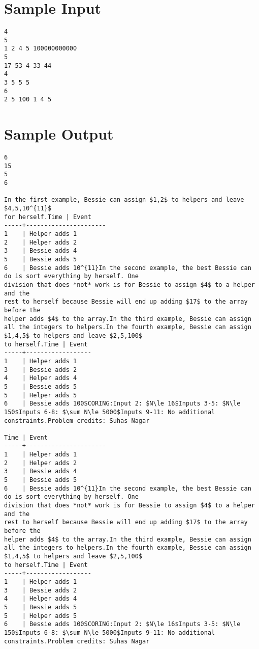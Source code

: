 \documentclass[12pt]{article}
\begin{document}
\section*{Sample Input}
\begin{verbatim}
4
5
1 2 4 5 100000000000
5
17 53 4 33 44
4
3 5 5 5
6
2 5 100 1 4 5
\end{verbatim}

\section*{Sample Output}
\begin{verbatim}
6
15
5
6

In the first example, Bessie can assign $1,2$ to helpers and leave $4,5,10^{11}$
for herself.Time | Event
-----+----------------------
1    | Helper adds 1
2    | Helper adds 2
3    | Bessie adds 4
5    | Bessie adds 5
6    | Bessie adds 10^{11}In the second example, the best Bessie can do is sort everything by herself. One
division that does *not* work is for Bessie to assign $4$ to a helper and the
rest to herself because Bessie will end up adding $17$ to the array before the
helper adds $4$ to the array.In the third example, Bessie can assign all the integers to helpers.In the fourth example, Bessie can assign $1,4,5$ to helpers and leave $2,5,100$
to herself.Time | Event
-----+------------------
1    | Helper adds 1
3    | Bessie adds 2
4    | Helper adds 4
5    | Bessie adds 5
5    | Helper adds 5
6    | Bessie adds 100SCORING:Input 2: $N\le 16$Inputs 3-5: $N\le 150$Inputs 6-8: $\sum N\le 5000$Inputs 9-11: No additional constraints.Problem credits: Suhas Nagar

Time | Event
-----+----------------------
1    | Helper adds 1
2    | Helper adds 2
3    | Bessie adds 4
5    | Bessie adds 5
6    | Bessie adds 10^{11}In the second example, the best Bessie can do is sort everything by herself. One
division that does *not* work is for Bessie to assign $4$ to a helper and the
rest to herself because Bessie will end up adding $17$ to the array before the
helper adds $4$ to the array.In the third example, Bessie can assign all the integers to helpers.In the fourth example, Bessie can assign $1,4,5$ to helpers and leave $2,5,100$
to herself.Time | Event
-----+------------------
1    | Helper adds 1
3    | Bessie adds 2
4    | Helper adds 4
5    | Bessie adds 5
5    | Helper adds 5
6    | Bessie adds 100SCORING:Input 2: $N\le 16$Inputs 3-5: $N\le 150$Inputs 6-8: $\sum N\le 5000$Inputs 9-11: No additional constraints.Problem credits: Suhas Nagar


\end{verbatim}
\end{document}
